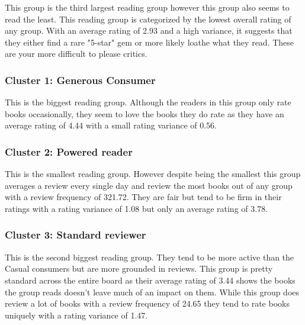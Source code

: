 \documentclass[conference]{IEEEtran}
\begin{document}
This group is the third largest reading group however this group also seems to read the least. This reading group is categorized by the lowest overall rating of any group. With an average rating of 2.93 and a high variance, it suggests that they either find a rare "5-star" gem or more likely loathe what they read. These are your more difficult to please critics.



\subsubsection{Cluster 1: Generous Consumer }

This is the biggest reading group. Although the readers in this group only rate books occasionally, they seem to love the books they do rate as they have an average rating of 4.44 with a small rating variance of 0.56.
\subsubsection{Cluster 2: Powered reader}

This is the smallest reading group. However despite being the smallest this group averages a review every single day and review the most books out of any group with a review frequency of 321.72. They are fair but tend to be firm in their ratings with a rating variance of 1.08 but only an average rating of 3.78.

\subsubsection{Cluster 3: Standard reviewer}

This is the second biggest reading group. They tend to be more active than the Casual consumers but are more grounded in reviews. This group is pretty standard across the entire board as their average rating of 3.44 shows the books the group reads doesn't leave much of an impact on them. While this group does review a lot of books with a review frequency of 24.65 they tend to rate books uniquely with a rating variance of 1.47.

\begin{table}[htbp]
\centering
\caption{User Persona Profiles by K-Means Cluster}
\label{tab:persona_profiles}
\end{table}
\end{document}
